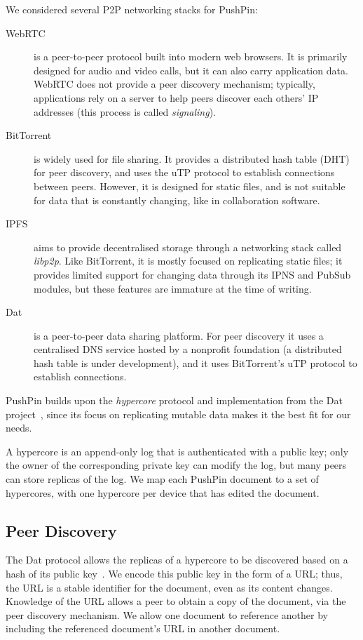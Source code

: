 \documentclass[sigplan,10pt]{acmart}
\begin{document}
We considered several P2P networking stacks for PushPin:
\begin{description}
\item[WebRTC] is a peer-to-peer protocol built into modern web browsers.
It is primarily designed for audio and video calls, but it can also carry application data.
WebRTC does not provide a peer discovery mechanism; typically, applications rely on a server to help peers discover each others' IP addresses (this process is called \emph{signaling}).
\item[BitTorrent] is widely used for file sharing.
It provides a distributed hash table (DHT) for peer discovery, and uses the uTP protocol to establish connections between peers.
However, it is designed for static files, and is not suitable for data that is constantly changing, like in collaboration software.
\item[IPFS] aims to provide decentralised storage through a networking stack called \emph{libp2p}.
Like BitTorrent, it is mostly focused on replicating static files; it provides limited support for changing data through its IPNS and PubSub modules, but these features are immature at the time of writing.
\item[Dat] \cite{HowDatWorks,Ogden:2018ur} is a peer-to-peer data sharing platform.
For peer discovery it uses a centralised DNS service hosted by a nonprofit foundation (a distributed hash table is under development), and it uses BitTorrent's uTP protocol to establish connections.
\end{description}

PushPin builds upon the \emph{hypercore} protocol and implementation from the Dat project~\cite{HowDatWorks}, since its focus on replicating mutable data makes it the best fit for our needs.

A hypercore is an append-only log that is authenticated with a public key; only the owner of the corresponding private key can modify the log, but many peers can store replicas of the log.
We map each PushPin document to a set of hypercores, with one hypercore per device that has edited the document.

\subsection{Peer Discovery}

The Dat protocol allows the replicas of a hypercore to be discovered based on a hash of its public key~\cite{HowDatWorks}.
We encode this public key in the form of a URL; thus, the URL is a stable identifier for the document, even as its content changes.
Knowledge of the URL allows a peer to obtain a copy of the document, via the peer discovery mechanism.
We allow one document to reference another by including the referenced document's URL in another document.
\end{document}
